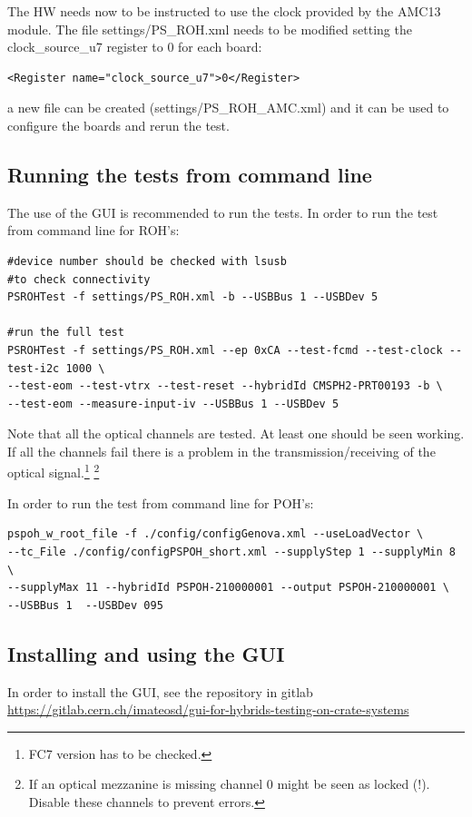 \documentclass[10pt,a4paper]{article}
\begin{document}
The HW needs now to be instructed to use the clock provided by the AMC13 module. The file settings/PS\_ROH.xml needs to be modified setting the clock\_source\_u7 register to 0 for each board:
\begin{framed}
\begin{verbatim}
<Register name="clock_source_u7">0</Register>
\end{verbatim}
\end{framed}
a new file can be created (settings/PS\_ROH\_AMC.xml) and it can be used to configure the boards and rerun the test.


\subsection{Running the tests from command line}
The use of the GUI is recommended to run the tests. 
In order to run the test from command line for ROH's:
\begin{framed}
\begin{verbatim}
#device number should be checked with lsusb
#to check connectivity
PSROHTest -f settings/PS_ROH.xml -b --USBBus 1 --USBDev 5 

#run the full test
PSROHTest -f settings/PS_ROH.xml --ep 0xCA --test-fcmd --test-clock --test-i2c 1000 \
--test-eom --test-vtrx --test-reset --hybridId CMSPH2-PRT00193 -b \
--test-eom --measure-input-iv --USBBus 1 --USBDev 5
\end{verbatim}
\end{framed}
Note that all the optical channels are tested. At least one should be seen working.
If all the channels fail there is a problem in the transmission/receiving of the optical signal.\footnote[1]{FC7 version has to be checked.}
\footnote[2]{If an optical mezzanine is missing channel 0 might be seen as locked (!). Disable these channels to prevent errors.}

In order to run the test from command line for POH's:
\begin{framed}
\begin{verbatim}
pspoh_w_root_file -f ./config/configGenova.xml --useLoadVector \
--tc_File ./config/configPSPOH_short.xml --supplyStep 1 --supplyMin 8 \
--supplyMax 11 --hybridId PSPOH-210000001 --output PSPOH-210000001 \
--USBBus 1  --USBDev 095
\end{verbatim}
\end{framed}


\subsection{Installing and using the GUI}
In order to install the GUI, see the repository in gitlab \\
\url{https://gitlab.cern.ch/imateosd/gui-for-hybrids-testing-on-crate-systems}\\
\end{document}
